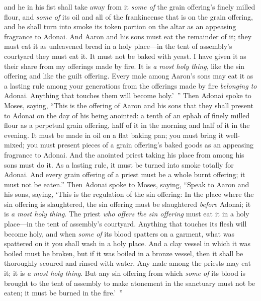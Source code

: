 \begin{biblechapter}
\verse and he in his fist shall take away from it \textit{some of} the grain offering’s finely milled flour, and \textit{some of} its oil and all of the frankincense that is on the grain offering, and he shall turn into smoke its token portion on the altar as an appeasing fragrance to Adonai.
\verse And Aaron and his sons must eat the remainder of it; they must eat it as unleavened bread in a holy place—in the tent of assembly’s courtyard they must eat it.
\verse It must not be baked with yeast. I have given it as their share from my offerings made by fire. It is \textit{a most holy thing}, like the sin offering and like the guilt offering.
\verse Every male among Aaron’s sons may eat it as a lasting rule among your generations from the offerings made by fire \textit{belonging to} Adonai. Anything that touches them will become holy.’ ”
\verse Then Adonai spoke to Moses, saying,
\verse “This is the offering of Aaron and his sons that they shall present to Adonai on the day of his being anointed: a tenth of an ephah of finely milled flour as a perpetual grain offering, half of it in the morning and half of it in the evening.
\verse It must be made in oil on a flat baking pan; you must bring it well-mixed; you must present pieces of a grain offering’s baked goods as an appeasing fragrance to Adonai.
\verse And the anointed priest taking his place from among his sons must do it. As a lasting rule, it must be turned into smoke totally for Adonai.
\verse And every grain offering of a priest must be a whole burnt offering; it must not be eaten.”
 Then Adonai spoke to Moses, saying,
\verse “Speak to Aaron and his sons, saying, ‘This is the regulation of the sin offering: In the place where the sin offering is slaughtered, the sin offering must be slaughtered \textit{before} Adonai; it is \textit{a most holy thing}.
\verse The priest \textit{who offers the sin offering} must eat it in a holy place—in the tent of assembly’s courtyard.
\verse Anything that touches its flesh will become holy, and when \textit{some of} its blood spatters on a garment, what was spattered on it you shall wash in a holy place.
\verse And a clay vessel in which it was boiled must be broken, but if it was boiled in a bronze vessel, then it shall be thoroughly scoured and rinsed with water.
\verse Any male among the priests may eat it; it is \textit{a most holy thing}.
\verse But any sin offering from which \textit{some of} its blood is brought to the tent of assembly to make atonement in the sanctuary must not be eaten; it must be burned in the fire.’ ”
\end{biblechapter}

